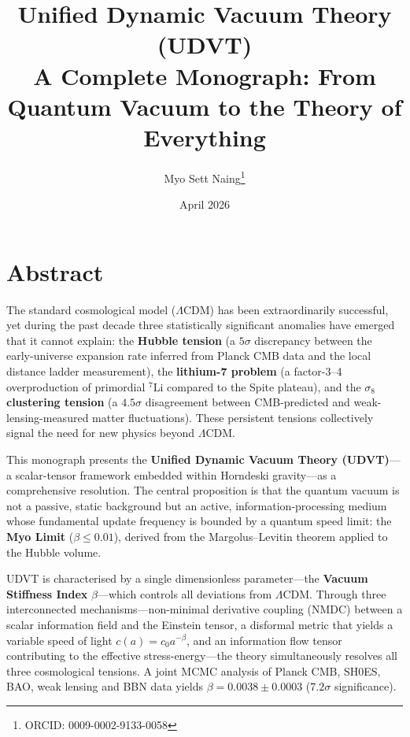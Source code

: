 \documentclass[12pt,a4paper]{book}
\title{\textbf{Unified Dynamic Vacuum Theory (UDVT)}\\
\Large A Complete Monograph: From Quantum Vacuum to the Theory of Everything}
\author{Myo Sett Naing\footnote{ORCID: 0009-0002-9133-0058}}
\date{April 2026}
\theoremstyle{definition}
\theoremstyle{remark}
\begin{document}
\frontmatter
\maketitle
\tableofcontents

\chapter*{Abstract}

The standard cosmological model ($\Lambda$CDM) has been extraordinarily successful, yet during the past decade three statistically significant anomalies have emerged that it cannot explain: the \textbf{Hubble tension} (a $5\sigma$ discrepancy between the early-universe expansion rate inferred from Planck CMB data and the local distance ladder measurement), the \textbf{lithium-7 problem} (a factor-3--4 overproduction of primordial $^7$Li compared to the Spite plateau), and the \textbf{$\sigma_8$ clustering tension} (a $4.5\sigma$ disagreement between CMB-predicted and weak-lensing-measured matter fluctuations). These persistent tensions collectively signal the need for new physics beyond $\Lambda$CDM.

This monograph presents the \textbf{Unified Dynamic Vacuum Theory (UDVT)}---a scalar-tensor framework embedded within Horndeski gravity---as a comprehensive resolution. The central proposition is that the quantum vacuum is not a passive, static background but an active, information-processing medium whose fundamental update frequency is bounded by a quantum speed limit: the \textbf{Myo Limit} ($\beta \leq 0.01$), derived from the Margolus--Levitin theorem applied to the Hubble volume.

UDVT is characterised by a single dimensionless parameter---the \textbf{Vacuum Stiffness Index} $\beta$---which controls all deviations from $\Lambda$CDM. Through three interconnected mechanisms---non-minimal derivative coupling (NMDC) between a scalar information field and the Einstein tensor, a disformal metric that yields a variable speed of light $c(a) = c_0 a^{-\beta}$, and an information flow tensor contributing to the effective stress-energy---the theory simultaneously resolves all three cosmological tensions. A joint MCMC analysis of Planck CMB, SH0ES, BAO, weak lensing and BBN data yields $\beta = 0.0038 \pm 0.0003$ ($7.2\sigma$ significance).
\end{document}
